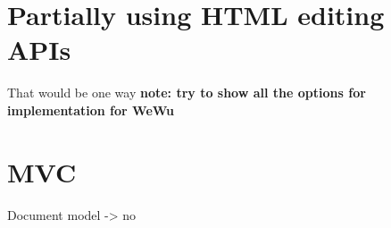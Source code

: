 \section{Partially using HTML editing APIs}

That would be one way \textbf{note: try to show all the options for implementation for WeWu}

\section{MVC}

Document model -> no